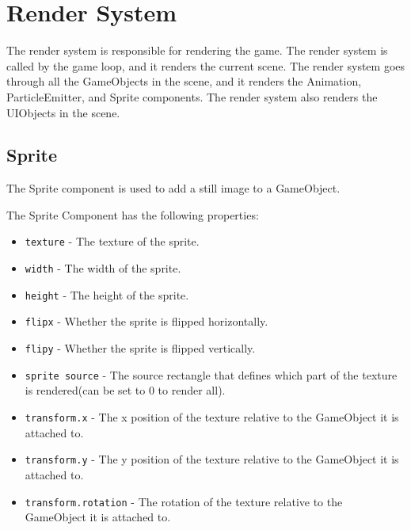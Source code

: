 \section{Render System}
\label{sec:rendersystem}
The render system is responsible for rendering the game.
The render system is called by the game loop, and it renders the current scene.
The render system goes through all the GameObjects in the scene, and it renders the Animation, ParticleEmitter, and Sprite components.
The render system also renders the UIObjects in the scene.

\subsection{Sprite}
The Sprite component is used to add a still image to a GameObject.

The Sprite Component has the following properties:
\begin{itemize}
    \item \texttt{texture} - The texture of the sprite.
    \item \texttt{width} - The width of the sprite.
    \item \texttt{height} - The height of the sprite.
    \item \texttt{flipx} - Whether the sprite is flipped horizontally.
    \item \texttt{flipy} - Whether the sprite is flipped vertically.
    \item \texttt{sprite source} - The source rectangle that defines which part of the texture is rendered(can be set to 0 to render all).
    \item \texttt{transform.x} - The x position of the texture relative to the GameObject it is attached to.
    \item \texttt{transform.y} - The y position of the texture relative to the GameObject it is attached to.
    \item \texttt{transform.rotation} - The rotation of the texture relative to the GameObject it is attached to.
\end{itemize}

